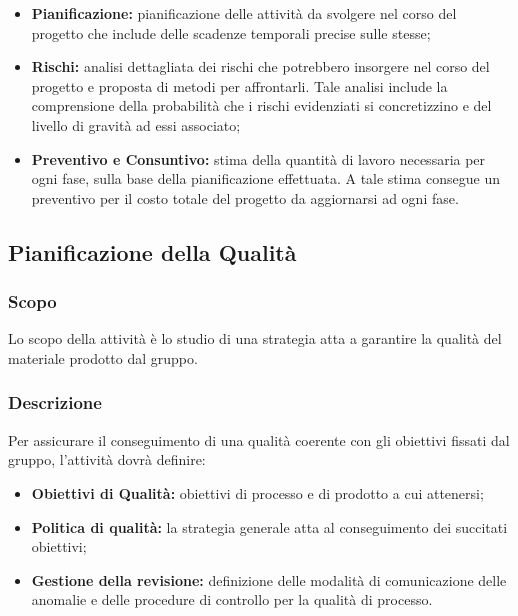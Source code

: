 \documentclass[../NormediProgetto.tex]{subfiles}
\begin{document}
\begin{itemize}
	    
	\item \textbf{Pianificazione:} pianificazione delle attività da svolgere nel corso del progetto che include delle scadenze temporali precise sulle stesse;
	
    \item \textbf{Rischi:} analisi dettagliata dei rischi che potrebbero insorgere nel corso del progetto e proposta di metodi per affrontarli. Tale analisi include la comprensione della probabilità che i rischi evidenziati si concretizzino e del livello di gravità ad essi associato;

    \item \textbf{Preventivo e Consuntivo:} stima della quantità di lavoro necessaria per ogni fase, sulla base della pianificazione effettuata. A tale stima consegue un preventivo per il costo totale del progetto da aggiornarsi ad ogni fase.
    
\end{itemize}


\subsection{Pianificazione della Qualità}

\subsubsection{Scopo}

Lo scopo della attività è lo studio di una strategia atta a garantire la qualità del materiale prodotto dal gruppo. 

\subsubsection{Descrizione}

Per assicurare il conseguimento di una qualità coerente con gli obiettivi fissati dal gruppo, l'attività dovrà definire:

\begin{itemize}
	    
	\item \textbf{Obiettivi di Qualità:} obiettivi di processo e di prodotto a cui attenersi;
	
    \item \textbf{Politica di qualità:} la strategia generale atta al conseguimento dei succitati obiettivi;

    \item \textbf{Gestione della revisione:} definizione delle modalità di comunicazione delle anomalie e delle procedure di controllo per la qualità di processo.
\end{itemize}
\end{document}
